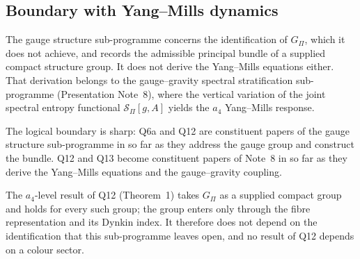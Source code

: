 \documentclass[11pt,a4paper]{article}
\theoremstyle{definition}
\newcommand{\Gpi}{G_{\Pi}}
\begin{document}
    \subsection{Boundary with Yang--Mills dynamics}
      \label{sec:ym-boundary}

      The gauge structure sub-programme concerns the identification of $\Gpi$, which it does not
      achieve, and records the admissible principal bundle of a supplied compact structure group.
      It does not derive the Yang--Mills equations either.
      That derivation belongs to the gauge--gravity spectral stratification sub-programme
      (Presentation Note~8), where the vertical variation of the joint spectral entropy
      functional $\mathcal{S}_\Pi[g, A]$ yields the $a_4$ Yang--Mills response.

      The logical boundary is sharp: Q6a and Q12 are constituent papers of the gauge
      structure sub-programme in so far as they address the gauge group and construct
      the bundle.
      Q12 and Q13 become constituent papers of Note~8 in so far as they derive the
      Yang--Mills equations and the gauge--gravity coupling.

      The $a_4$-level result of Q12 (Theorem~1) takes $\Gpi$ as a supplied compact group and holds
      for every such group; the group enters only through the fibre representation and its Dynkin
      index.
      It therefore does not depend on the identification that this sub-programme leaves open, and
      no result of Q12 depends on a colour sector.
\end{document}
